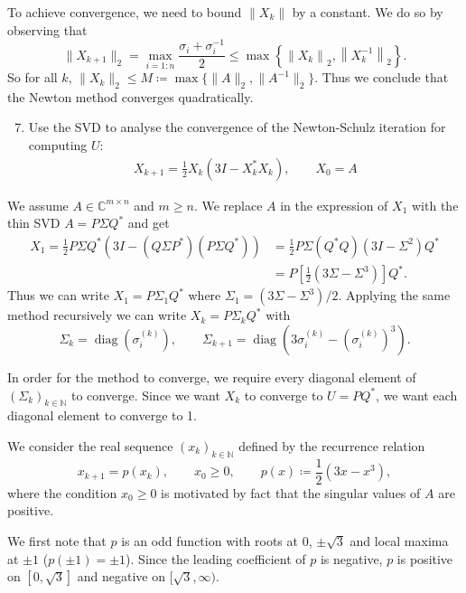 \documentclass[10pt, A4paper]{article}
\newcommand{\mxn}{m \times n}
\DeclareMathOperator{\diag}{diag}
\begin{document}
To achieve convergence, we need to bound $\|X_k\|$ by a 
constant. We do so by observing that
$$
	\|X_{k+1}\|_2 = \max_{i = 1:n} \frac{\sigma_i + \sigma_i^{-1}}{2}
	\leq \max \left\{ \left\|X_k \right\|_2
	, \left\|X_k^{-1} \right\|_2 \right\}.
$$
So for all $k$, $\|X_k\|_2 \leq M \coloneqq \max\{\|A\|_2, 
\|A^{-1}\|_2\}$.
Thus we conclude that the Newton method converges quadratically.





\vspace{0.2cm}
\begin{enumerate}
	\setcounter{enumi}{6}
	\item Use the SVD to analyse the convergence of the
	Newton\nobreakdash-Schulz iteration for computing $U$:
	\begin{align*}
		X_{k+1} = \frac{1}{2}X_k(3I - X_k^* X_k), \qquad X_0 = A
	\end{align*}
\end{enumerate}

We assume $A \in \mathbb{C}^{\mxn}$ and $m\geq n$. We replace $A$ in 
the expression of $X_1$ with the thin SVD $A = P \Sigma Q^*$ and get
\begin{align*}
	X_1 = \frac{1}{2}P \Sigma Q^*
	\left(3I - (Q\Sigma P^*) (P \Sigma Q^*)\right)
	   &= \frac{1}{2} P \Sigma (Q^* Q) (3I - \Sigma^2) Q^* \\
	   &= P \left[ \frac{1}{2} (3\Sigma - \Sigma^3) \right] Q^*.
\end{align*}
Thus we can write $X_1 = P \Sigma_1 Q^*$ where $\Sigma_1 = (3\Sigma - 
\Sigma^3)/2$.
Applying the same method recursively we can write $X_k = P\Sigma_k Q^*$ 
with
$$
\Sigma_k = \diag(\sigma_i^{(k)}), \qquad \Sigma_{k+1} = \diag
(3\sigma_i^{(k)} - (\sigma_i^{(k)})^3).
$$

In order for the method to converge, we require every diagonal element 
of $(\Sigma_k)_{k\in\mathbb{N}}$ to converge. Since we want $X_k$ to 
converge to $U = PQ^*$, we want each diagonal element to converge to 1. 

We consider the real sequence $(x_k)_{k \in \mathbb{N}}$ defined by the 
recurrence relation
$$
	x_{k+1} = p(x_k), \qquad x_0 \geq 0, \qquad p(x) \coloneqq 
	\frac{1}{2} (3x - x^3),
$$
where the condition $x_0 \geq 0$ is motivated by fact that the 
singular values of $A$ are positive.

We first note that $p$ is an odd function with roots at 0, $\pm\sqrt{3}$
and local maxima at $\pm1$ ($p(\pm1) = \pm1$).
Since the leading coefficient of $p$ is negative, $p$ is positive on 
$[0,\sqrt{3}]$ and negative on $[\sqrt{3}, \infty)$.
\end{document}
